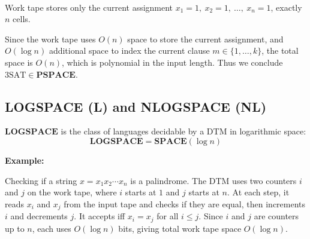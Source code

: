 \documentclass[12pt,a4paper,openany]{article}
\begin{document}
\begin{center}
\\[0.5em]
{\small Work tape stores only the current assignment $x_1=1,\ x_2=1,\ \ldots,\ x_n=1$, exactly $n$ cells.}
\end{center}

Since the work tape uses $O(n)$ space to store the current assignment, 
and $O(\log n)$ additional space to index the current clause $m \in \{1,\ldots,k\}$, 
the total space is $O(n)$, which is polynomial in the input length. 
Thus we conclude $\mathrm{3SAT} \in \mathbf{PSPACE}$.

\subsection{LOGSPACE (L) and NLOGSPACE (NL)}

\noindent $\mathbf{LOGSPACE}$ is the class of languages decidable by a DTM in logarithmic space:
\begin{equation*}
\mathbf{LOGSPACE} = \mathbf{SPACE}(\log n)
\end{equation*}

\textbf{Example:}

Checking if a string $x = x_1 x_2 \cdots x_n$ is a palindrome.
The DTM uses two counters $i$ and $j$ on the work tape, where $i$ starts at $1$ and
$j$ starts at $n$. At each step, it reads $x_i$ and $x_j$ from the input tape and
checks if they are equal, then increments $i$ and decrements $j$. It accepts iff
$x_i = x_j$ for all $i \leq j$. Since $i$ and $j$ are counters up to $n$, each
uses $O(\log n)$ bits, giving total work tape space $O(\log n)$.
\end{document}
